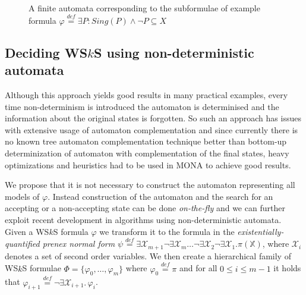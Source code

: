\documentclass{eeict}
\begin{document}
\begin{figure}
\begin{center}
 \end{center}
 \caption{A finite automata corresponding to the subformulae of example formula
 $\varphi \overset{\mathit{def}}{=} \exists P:
 Sing(P) \wedge\neg P \subseteq X$}\label{example}
\end{figure}

\subsection{Deciding WS$k$S using non-deterministic automata}

Although this approach yields good results in many practical examples, every
time non-determinism is introduced the automaton is determinised and the
information about the original states is forgotten. So such an approach has
issues with extensive usage of automaton complementation and since currently there is no known tree automaton complementation technique
better than bottom-up determinization of automaton with complementation of the
final states, heavy optimizations and heuristics had to be used in MONA to
achieve good results.

We propose that it is not necessary to construct the automaton representing all
models of $\varphi$. Instead construction of the automaton and the search for an
accepting or a non-accepting state can be done \emph{on-the-fly} and we can further exploit
recent development in algorithms using non-deterministic automata. Given a
WS$k$S formula $\varphi$ we transform it to the formula in the \emph{existentially-quantified prenex normal form} $\psi \overset{\mathit{def}}{=}
\exists\mathcal{X}_{m+1}\neg\exists\mathcal{X}_m\ldots\neg\exists\mathcal{X}_2\neg\exists\mathcal{X}_1.\pi(\mathds{X})$,
where $\mathcal{X}_i$ denotes a set of second order variables.
We then create a hierarchical family of WS$k$S formulae $\Phi =
\{\varphi_0,\ldots,\varphi_m\}$ where $\varphi_0 \overset{\mathit{def}}{=} \pi$ and for all $0 \leq i \leq
m-1$ it holds that $\varphi_{i+1} \overset{\mathit{def}}{=}
\neg\exists\mathcal{X}_{i+1}.\,\varphi_i$.
\end{document}
